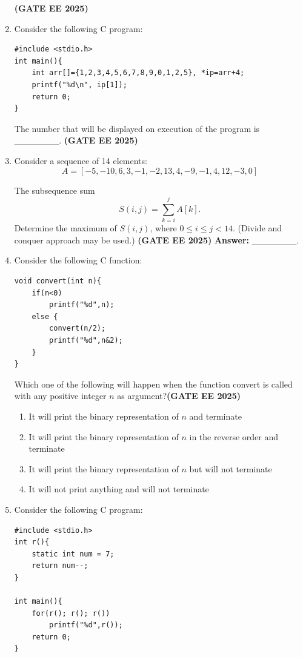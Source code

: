 \documentclass[journal,12pt,onecolumn]{IEEEtran}
\theoremstyle{remark}
\begin{document}
\begin{enumerate}
\hfill \textbf{(GATE EE 2025)}
\item Consider the following C program:
\begin{verbatim}
#include <stdio.h>
int main(){
    int arr[]={1,2,3,4,5,6,7,8,9,0,1,2,5}, *ip=arr+4;
    printf("%d\n", ip[1]);
    return 0;
}
\end{verbatim}

The number that will be displayed on execution of the program is \_\_\_\_\_\_\_.
\hfill \textbf{(GATE EE 2025)}


\item  Consider a sequence of 14 elements: 
\[
A = [-5,-10,6,3,-1,-2,13,4,-9,-1,4,12,-3,0]
\]

The subsequence sum 
\[
S(i,j) = \sum_{k=i}^{j} A[k].
\]
Determine the maximum of $S(i,j)$, where $0 \leq i \leq j < 14$. (Divide and conquer approach may be used.)
\hfill \textbf{(GATE EE 2025)}
\textbf{Answer:} \_\_\_\_\_\_\_.



\item Consider the following C function:
\begin{verbatim}
void convert(int n){
    if(n<0)
        printf("%d",n);
    else {
        convert(n/2);
        printf("%d",n&2);
    }
}
\end{verbatim}

Which one of the following will happen when the function convert is called with any positive integer $n$ as argument?\hfill \textbf{(GATE EE 2025)}

\begin{enumerate}
\item  It will print the binary representation of $n$ and terminate
\item  It will print the binary representation of $n$ in the reverse order and terminate
\item  It will print the binary representation of $n$ but will not terminate
\item  It will not print anything and will not terminate
\end{enumerate}



\item  Consider the following C program:
\begin{verbatim}
#include <stdio.h>
int r(){
    static int num = 7;
    return num--;
}

int main(){
    for(r(); r(); r())
        printf("%d",r());
    return 0;
}
\end{verbatim}


\end{enumerate}
\end{document}
